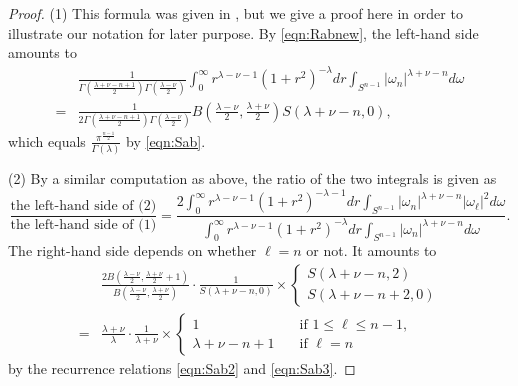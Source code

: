 \begin{proof}
(1)\enspace
This formula was given in \cite[Prop.~7.4]{sbon}, 
 but we give a proof here 
 in order to illustrate our notation
 for later purpose.  
By \eqref{eqn:Rabnew}, 
 the left-hand side amounts to 
\begin{align*}
&\frac{1}{\Gamma(\frac{\lambda+\nu-n+1}{2})\Gamma(\frac{\lambda-\nu}{2})} 
\int_0^{\infty} r^{\lambda-\nu-1} (1+r^2)^{-\lambda} d r
          \int_{S^{n-1}}|\omega_n|^{\lambda+\nu-n} d \omega
\\
=&
\frac{1}{2\Gamma(\frac{\lambda+\nu-n+1}{2})\Gamma(\frac{\lambda-\nu}{2})}
B(\frac{\lambda-\nu}{2},\frac{\lambda+\nu}2)S(\lambda+\nu-n,0), 
\end{align*}
which equals $\frac{\pi^{\frac {n-1}2}}{\Gamma(\lambda)}$
 by \eqref{eqn:Sab}.  
\par\noindent
(2)\enspace
By a similar computation as above,
 the ratio of the two integrals is given as 
\begin{equation*}
\frac{\text{the left-hand side of (2)}}
      {\text{the left-hand side of (1)}}
 =
 \frac{2 \int_0^{\infty} r^{\lambda-\nu-1} (1+r^2)^{-\lambda-1} d r
       \int_{S^{n-1}}|\omega_n|^{\lambda+\nu-n} |\omega_{\ell}|^2 d \omega}
      {\int_0^{\infty} r^{\lambda-\nu-1} (1+r^2)^{-\lambda} d r
       \int_{S^{n-1}}|\omega_n|^{\lambda+\nu-n} d \omega}.  
\end{equation*}
The right-hand side depends on 
 whether $\ell=n$ or not.  
It amounts to 
\begin{align*}
&\frac{2B(\frac{\lambda-\nu}{2}, \frac{\lambda+\nu}2+1)}
     {B(\frac{\lambda-\nu}{2}, \frac{\lambda+\nu}{2})}
\cdot
\frac{1}{S(\lambda+\nu-n,0)}
\times
\begin{cases}
  S(\lambda+\nu-n,2)
\\
  S(\lambda+\nu-n+2,0)
\end{cases}
\\
=&
\frac{\lambda+\nu}
     {\lambda}
\cdot
\frac{1}{\lambda+\nu}
\times
\begin{cases}
  1
\quad
&\text{if $1\le \ell \le n-1$}, 
\\
\lambda + \nu -n+1
\quad
&\text{if $\ell=n$}
\end{cases}
\end{align*}
by the recurrence relations
 \eqref{eqn:Sab2} and \eqref{eqn:Sab3}.  
\end{proof}


